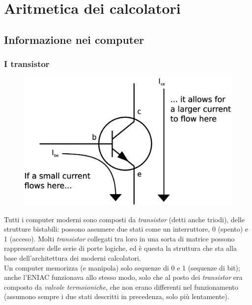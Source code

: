 \documentclass[class=book, crop=false, oneside]{standalone}
\begin{document}
\chapter{Aritmetica dei calcolatori}

\section{Informazione nei computer}

\subsection{I transistor}

\begin{figure}
	\includegraphics[width=\linewidth]{transistor.eps}
	\label{fig:transistor}
	\centering
\end{figure}

Tutti i computer moderni sono composti da \emph{transistor} (detti anche triodi), delle strutture bistabili: possono assumere due stati come un interruttore, 0 (spento) e 1 (acceso). Molti \emph{transistor} collegati tra loro in una sorta di matrice possono rappresentare delle serie di porte logiche, ed è questa la struttura che sta alla base dell'architettura dei moderni calcolatori.\\
Un computer memorizza (e manipola) solo sequenze di 0 e 1 (sequenze di bit); anche l’ENIAC funzionava allo stesso modo, solo che al posto dei \emph{transistor} era composto da \emph{valvole termoioniche}, che non erano differenti nel funzionamento (assumono sempre i due stati descritti in precedenza, solo più lentamente).
\end{document}
